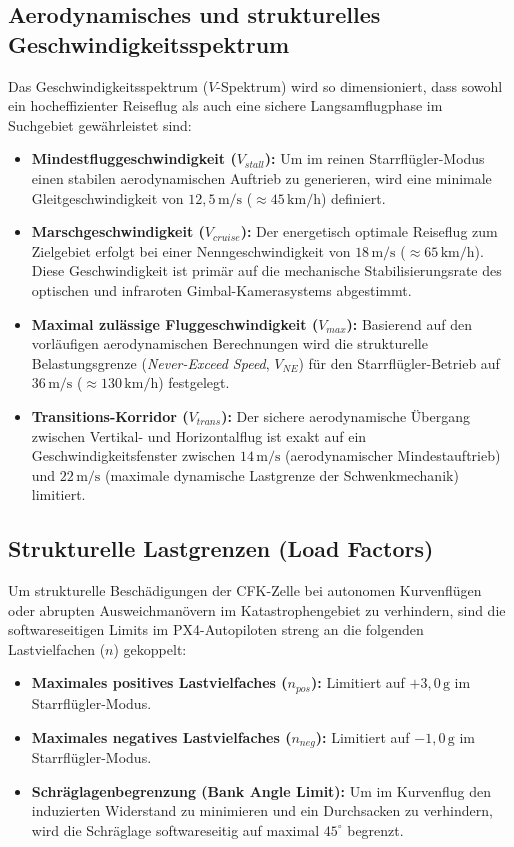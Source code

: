 \subsection{Aerodynamisches und strukturelles Geschwindigkeitsspektrum}
Das Geschwindigkeitsspektrum ($V$-Spektrum) wird so dimensioniert, dass sowohl ein hocheffizienter Reiseflug als auch eine sichere Langsamflugphase im Suchgebiet gewährleistet sind:
\begin{itemize}
    \item \textbf{Mindestfluggeschwindigkeit ($V_{stall}$):} Um im reinen Starrflügler-Modus einen stabilen aerodynamischen Auftrieb zu generieren, wird eine minimale Gleitgeschwindigkeit von $12{,}5\,\text{m/s}$ ($\approx 45\,\text{km/h}$) definiert.
    \item \textbf{Marschgeschwindigkeit ($V_{cruise}$):} Der energetisch optimale Reiseflug zum Zielgebiet erfolgt bei einer Nenngeschwindigkeit von $18\,\text{m/s}$ ($\approx 65\,\text{km/h}$). 
                                                         Diese Geschwindigkeit ist primär auf die mechanische Stabilisierungsrate des optischen und infraroten Gimbal-Kamerasystems abgestimmt.
    \item \textbf{Maximal zulässige Fluggeschwindigkeit ($V_{max}$):} Basierend auf den vorläufigen aerodynamischen Berechnungen wird die strukturelle Belastungsgrenze (\textit{Never-Exceed Speed}, $V_{NE}$) 
                                                                      für den Starrflügler-Betrieb auf $36\,\text{m/s}$ ($\approx 130\,\text{km/h}$) festgelegt.
    \item \textbf{Transitions-Korridor ($V_{trans}$):} Der sichere aerodynamische Übergang zwischen Vertikal- und Horizontalflug ist exakt auf ein Geschwindigkeitsfenster zwischen $14\,\text{m/s}$ (aerodynamischer Mindestauftrieb) 
                                                       und $22\,\text{m/s}$ (maximale dynamische Lastgrenze der Schwenkmechanik) limitiert.
\end{itemize}

\subsection{Strukturelle Lastgrenzen (Load Factors)}
Um strukturelle Beschädigungen der CFK-Zelle bei autonomen Kurvenflügen oder abrupten Ausweichmanövern im Katastrophengebiet zu verhindern, sind die softwareseitigen Limits im PX4-Autopiloten streng an die folgenden Lastvielfachen ($n$) gekoppelt:
\begin{itemize}
    \item \textbf{Maximales positives Lastvielfaches ($n_{pos}$):} Limitiert auf $+3{,}0\,\text{g}$ im Starrflügler-Modus.
    \item \textbf{Maximales negatives Lastvielfaches ($n_{neg}$):} Limitiert auf $-1{,}0\,\text{g}$ im Starrflügler-Modus.
    \item \textbf{Schräglagenbegrenzung (Bank Angle Limit):} Um im Kurvenflug den induzierten Widerstand zu minimieren und ein Durchsacken zu verhindern, wird die Schräglage softwareseitig auf maximal $45^\circ$ begrenzt.
\end{itemize}

